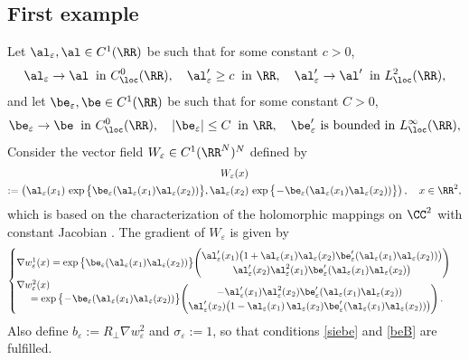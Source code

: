 \subsection{First example}\label{ss.exa1}
Let $\al_\varepsilon,\al\in C^1(\RR)$ be such that for some constant $c>0$,
\begin{equation}\label{ae}
\al_\varepsilon\to\al\;\;\mbox{in }C^0_\loc(\RR),\quad \al_\varepsilon'\geq c\;\;\mbox{in }\RR,\quad\al_\varepsilon'\to\al'\;\;\mbox{in }L^2_\loc(\RR),
\end{equation}
and let $\be_\varepsilon,\be\in C^1(\RR)$ be such that for some constant $C>0$,
\begin{equation}\label{bee}
\be_\varepsilon\to\be\;\;\mbox{in }C^0_\loc(\RR),\quad |\be_\varepsilon|\leq C\;\;\mbox{in }\RR,\quad \be_\varepsilon'\mbox{ is bounded in }L^\infty_\loc(\RR),
\end{equation}
Consider the vector field $W_\varepsilon\in C^1(\RR^N)^N$ defined by
\begin{multline}\label{Wecj}
W_\varepsilon(x)\\
:=\begin{pmatrix}\al_\varepsilon(x_1)\,\exp\big\{\be_\varepsilon(\al_\varepsilon(x_1)\al_\varepsilon(x_2))\big\},\al_\varepsilon(x_2)\,\exp\big\{\!-\!\be_\varepsilon(\al_\varepsilon(x_1)\al_\varepsilon(x_2))\big\}\end{pmatrix},\quad
x\in\RR^2,
\end{multline}
which is based on the characterization of the holomorphic mappings on $\CC^2$ with constant Jacobian \cite{Nis}.
The gradient of $W_\varepsilon$ is given by
\[
\begin{cases}
\nabla w_\varepsilon^1(x)=\exp\big\{\be_\varepsilon(\al_\varepsilon(x_1)\al_\varepsilon(x_2))\big\}\!\begin{pmatrix}
\al_\varepsilon'(x_1)\big(1+\al_\varepsilon(x_1)\al_\varepsilon(x_2)\be_\varepsilon'(\al_\varepsilon(x_1)\al_\varepsilon(x_2))\big)
\\
\al_\varepsilon'(x_2)\al_\varepsilon^2(x_1)\be_\varepsilon'(\al_\varepsilon(x_1)\al_\varepsilon(x_2)\big)
\end{pmatrix}
\\
\nabla w_\varepsilon^2(x)\\[-8pt]
\hspace*{.5cm}=\exp\big\{\!-\!\be_\varepsilon(\al_\varepsilon(x_1)\al_\varepsilon(x_2))\big\}\!\begin{pmatrix}
-\al_\varepsilon'(x_1)\al_\varepsilon^2(x_2)\be_\varepsilon'(\al_\varepsilon(x_1)\al_\varepsilon(x_2))
\\
\al_\varepsilon'(x_2)\big(1-\al_\varepsilon(x_1)\,\al_\varepsilon(x_2)\be_\varepsilon'(\al_\varepsilon(x_1)\al_\varepsilon(x_2))\big)
\end{pmatrix}.
\end{cases}
\]
Also define $b_\varepsilon:=R_\perp\nabla w_\varepsilon^2$ and $\sigma_\varepsilon:=1$, so that conditions \eqref{siebe} and \eqref{beB} are fulfilled.

